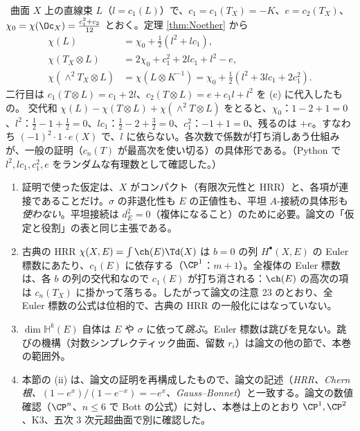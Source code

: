 \begin{ex}[$n=2$ の手計算：$c_1(E)$ が消える様子]\label{ex:hand2}\tP\
曲面 $X$ 上の直線束 $L$（$l=c_1(L)$）で、$c_1=c_1(T_X)=-K$、$e=c_2(T_X)$、$\chi_0=\chi(\Oc_X)=\frac{c_1^2+c_2}{12}$ とおく。定理 \ref{thm:Noether} から
\begin{align*}
\chi(L)&=\chi_0+\tfrac12(l^2+lc_1),\\
\chi(T_X\otimes L)&=2\chi_0+c_1^2+2lc_1+l^2-e,\\
\chi(\wedge^2T_X\otimes L)&=\chi(L\otimes K^{-1})=\chi_0+\tfrac12(l^2+3lc_1+2c_1^2).
\end{align*}
二行目は $c_1(T\otimes L)=c_1+2l$、$c_2(T\otimes L)=e+c_1l+l^2$ を (c) に代入したもの。
交代和 $\chi(L)-\chi(T\otimes L)+\chi(\wedge^2T\otimes L)$ をとると、$\chi_0$：$1-2+1=0$、$l^2$：$\frac12-1+\frac12=0$、$lc_1$：$\frac12-2+\frac32=0$、$c_1^2$：$-1+1=0$、残るのは $+e$。すなわち $(-1)^2\cdot1\cdot e(X)$ で、$l$ に依らない。各次数で係数が打ち消しあう仕組みが、一般の証明（$c_n(T)$ が最高次を使い切る）の具体形である。（Python で $l^2,lc_1,c_1^2,e$ をランダムな有理数として確認した。）
\end{ex}
\begin{rem}\label{rem:unifiedcaveat}
\begin{enumerate}
\item 証明で使った仮定は、$X$ がコンパクト（有限次元性と HRR）と、各項が連接であることだけ。$\sigma$ の非退化性も $E$ の正値性も、平坦 $A$-接続の具体形も\emph{使わない}。平坦接続は $d_E^2=0$（複体になること）のために必要。論文の「仮定と役割」の表と同じ主張である。
\item 古典の HRR $\chi(X,E)=\int\ch(E)\Td(X)$ は $b=0$ の列 $H^\bullet(X,E)$ の Euler 標数にあたり、$c_1(E)$ に依存する（$\CP^1$：$m+1$）。全複体の Euler 標数は、各 $b$ の列の交代和なので $c_1(E)$ が打ち消される：$\ch(E)$ の高次の項は $c_n(T_X)$ に掛かって落ちる。したがって論文の注意 23 のとおり、全 Euler 標数の公式は位相的で、古典の HRR の一般化にはなっていない。
\item $\dim\mathbb H^k(E)$ 自体は $E$ や $\sigma$ に依って\emph{跳ぶ}。Euler 標数は跳びを見ない。跳びの機構（対数シンプレクティック曲面、留数 $r_i$）は論文の他の節で、本巻の範囲外。
\item 本節の (ii) は、論文の証明を再構成したもので、論文の記述（\emph{HRR、Chern 根、$(1-e^x)/(1-e^{-x})=-e^x$、Gauss--Bonnet}）と一致する。論文の数値確認（$\CP^n$、$n\le6$ で Bott の公式）に対し、本巻は上のとおり $\CP^1,\CP^2$、K3、五次 3 次元超曲面で別に確認した。
\end{enumerate}
\end{rem}

